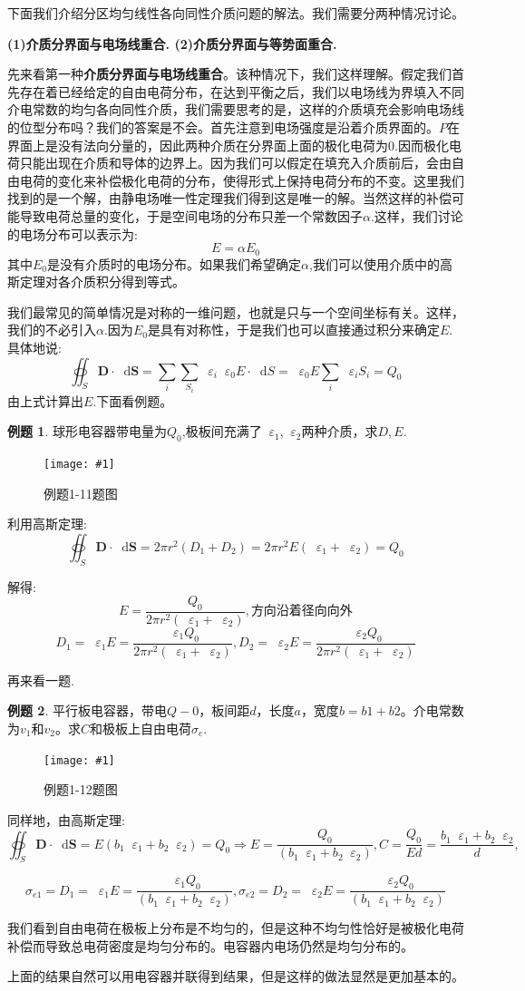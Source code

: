 \documentclass[12pt,a4paper,oneside]{report}
\theoremstyle{definition}
\newtheorem{example}{例题}[chapter]
\theoremstyle{remark}
\newcommand{\insertfig}[3]{
    \begin{figure}[ht]
        \centering
        \texttt{[image: \#1]}
        \caption{#2}
        \label{fig:#1}
    \end{figure}
}
\renewcommand{\d}{\mathop{}\!\mathrm{d}}
\renewcommand{\v}{\mathop{}\!\varepsilon}
\begin{document}
下面我们介绍分区均匀线性各向同性介质问题的解法。我们需要分两种情况讨论。

\textbf{(1)介质分界面与电场线重合.
(2)介质分界面与等势面重合.
}

先来看第一种\textbf{介质分界面与电场线重合}。该种情况下，我们这样理解。假定我们首先存在着已经给定的自由电荷分布，在达到平衡之后，我们以电场线为界填入不同介电常数的均匀各向同性介质，我们需要思考的是，这样的介质填充会影响电场线的位型分布吗？我们的答案是不会。首先注意到电场强度是沿着介质界面的。$P$在界面上是没有法向分量的，因此两种介质在分界面上面的极化电荷为0.因而极化电荷只能出现在介质和导体的边界上。因为我们可以假定在填充入介质前后，会由自由电荷的变化来补偿极化电荷的分布，使得形式上保持电荷分布的不变。这里我们找到的是一个解，由静电场唯一性定理我们得到这是唯一的解。当然这样的补偿可能导致电荷总量的变化，于是空间电场的分布只差一个常数因子$\alpha$.这样，我们讨论的电场分布可以表示为:
\[
E = \alpha E_0
\]
其中$E_0$是没有介质时的电场分布。如果我们希望确定$\alpha$,我们可以使用介质中的高斯定理对各介质积分得到等式。

我们最常见的简单情况是对称的一维问题，也就是只与一个空间坐标有关。这样，我们的不必引入$\alpha$.因为$E_0$是具有对称性，于是我们也可以直接通过积分来确定$E$. 具体地说:
\[
\oiint_S \mathbf{D} \cdot \d \mathbf{S}  = \sum_i \sum_{S_i}\v_i \v_0 E \cdot \d S = \v_0 E \sum_i \v_i S_i
= Q_0
\]
由上式计算出$E$.下面看例题。

\begin{example}
球形电容器带电量为$Q_0$,极板间充满了$\v_1$,$\v_2$两种介质，求$D,E$.
\insertfig{1-2.png}{例题1-11题图}{0.25}

利用高斯定理:
\[
\oiint_S \mathbf{D} \cdot \d \mathbf{S}  = 2\pi r^2 (D_1+D_2) =2\pi r^2 E(\v_1+\v_2) = Q_0
\]

解得:
\[
E=\frac{Q_0}{2\pi r^2(\v_1+\v_2)}, \text{方向沿着径向向外}
\]
\[
D_1 = \v_1 E = \frac{\v_1 Q_0}{2\pi r^2(\v_1+\v_2)}, D_2 = \v_2 E = \frac{\v_2 Q_0}{2\pi r^2(\v_1+\v_2)}
\]

\end{example}
再来看一题.
\begin{example}
  平行板电容器，带电$Q-0$，板间距$d$，长度$a$，宽度$b=b1+b2$。介电常数为$v_1$和$v_2$。求$C$和极板上自由电荷$\sigma_e$.

  \insertfig{1-3.png}{例题1-12题图}{0.25}

  同样地，由高斯定理:
  \[
  \oiint_S \mathbf{D} \cdot \d \mathbf{S}  = E(b_1\v_1+b_2\v_2) = Q_0
  \Rightarrow E=\frac{Q_0}{(b_1\v_1+b_2\v_2)} , C  = \frac{Q_0}{Ed} = \frac{b_1\v_1+b_2\v_2}{d}, 
  \]

  \[
\sigma_{e1} = D_1 = \v_1 E = \frac{\v_1 Q_0}{(b_1\v_1+b_2\v_2)}, \sigma_{e2} = D_2 = \v_2 E = \frac{\v_2 Q_0}{(b_1\v_1+b_2\v_2)}
  \]

我们看到自由电荷在极板上分布是不均匀的，但是这种不均匀性恰好是被极化电荷补偿而导致总电荷密度是均匀分布的。电容器内电场仍然是均匀分布的。

上面的结果自然可以用电容器并联得到结果，但是这样的做法显然是更加基本的。
\end{example}
\end{document}
